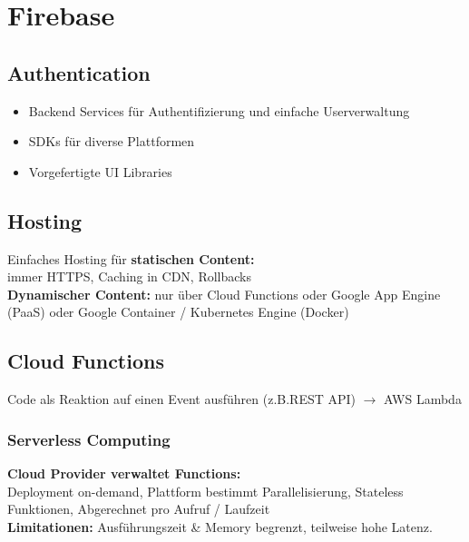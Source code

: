 


\section{Firebase}

\subsection{Authentication}
\begin{itemize}
    \item Backend Services für Authentifizierung und einfache Userverwaltung
    \item SDKs für diverse Plattformen
    \item Vorgefertigte UI Libraries
\end{itemize}

\subsection{Hosting}
Einfaches Hosting für \textbf{statischen Content:}\\
immer HTTPS, Caching in CDN, Rollbacks\\
\textbf{Dynamischer Content:} nur über Cloud Functions oder Google App Engine (PaaS) oder Google Container / Kubernetes Engine (Docker)

\subsection{Cloud Functions}
Code als Reaktion auf einen Event ausführen (z.B.REST API) $\rightarrow$ AWS Lambda

\subsubsection{Serverless Computing}
\textbf{Cloud Provider verwaltet Functions:}\\
Deployment on-demand, Plattform bestimmt Parallelisierung, Stateless Funktionen, Abgerechnet pro Aufruf / Laufzeit\\
\textbf{Limitationen:} Ausführungszeit \& Memory begrenzt, teilweise hohe Latenz.

